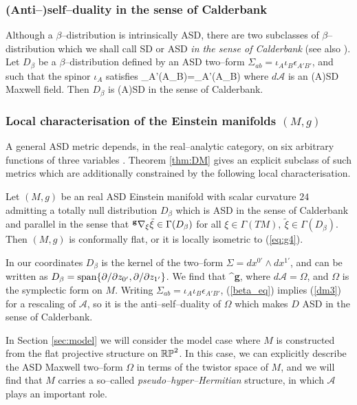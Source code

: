 \subsubsection{(Anti--)self--duality in the sense of Calderbank}
Although a $\beta$--distribution is intrinsically ASD, there are two subclasses of $\beta$--distribution which we shall call SD or ASD \textit{in the sense of Calderbank} \cite{Cal1} (see also \cite{West}). Let $D_\beta$ be a $\beta$--distribution defined by an ASD two--form $\Sigma_{ab}=\iota_A\iota_B\epsilon_{A'B'}$, and  such that the spinor $\iota_A$ satisfies
\be
\label{dm3}
\nabla_{A'(A}\iota_{B)}=_{A'(A}\iota_{B)}
\ee
where $d\mathcal{A}$ is an (A)SD Maxwell field. Then $D_\beta$ is (A)SD in the sense of Calderbank.

 
\subsubsection{Local characterisation of the Einstein manifolds $(M,g)$}

A general ASD metric depends, in the real--analytic category, on six arbitrary functions of three variables \cite{DFK}. Theorem \ref{thm:DM} gives an explicit subclass of such metrics which are additionally constrained by the following local characterisation.

\begin{theo}[\cite{DM}] \label{thm:DMcharacterisation}
Let $(M,g)$ be an real ASD Einstein manifold with scalar curvature $24$ admitting a totally null distribution $D_\beta$ which is ASD in the sense of Calderbank and parallel in the sense that $^{\bf g}\nabla_{\xi} \tilde{\xi}\in\Gamma(D_\beta)$ for all $\xi\in \Gamma(TM),\ \tilde{\xi}\in\Gamma(D_\beta)$. Then $(M,g)$ is conformally flat, or it is locally isometric to (\ref{eq:g4}).
\end{theo}
\noindent

In our coordinates $D_\beta$ is the kernel of the two--form $\Sigma=dx^{0'}\wedge dx^{1'}$, and can be written as ${D_\beta}=\mathrm{span}\{\partial/\partial z_{0'},\partial/\partial z_{1'}\}$. We find that
\be
\label{beta_eq}
^{\bf g}\nabla{}\otimes \Sigma,
\ee
where $d\mathcal{A}=\Omega$, and $\Omega$ is the symplectic form on $M$. Writing $\Sigma_{ab}=\iota_A\iota_B\epsilon_{A'B'}$, (\ref{beta_eq}) implies (\ref{dm3}) for a rescaling of $\mathcal{A}$, so it is the anti--self--duality of $\Omega$ which makes $D$ ASD in the sense of Calderbank.

In Section \ref{sec:model} we will consider the model case where $M$ is constructed from the flat projective structure on $\mathbb{RP}^2$. In this case, we can explicitly describe the ASD Maxwell two--form $\Omega$ in terms of the twistor space of $M$,
and we will find that $M$ carries a so--called \textit{pseudo--hyper--Hermitian} structure, in which $\mathcal{A}$ plays an important role.












